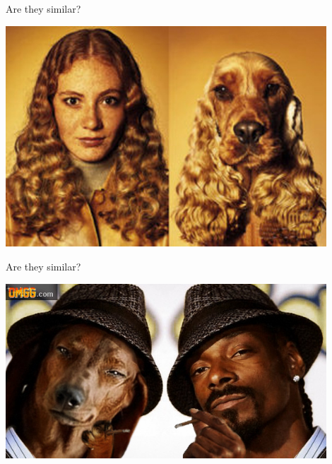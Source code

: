 \documentclass[pdf]{beamer}
\begin{document}
\begin{frame}{Are they similar?}
\begin{center}
	\includegraphics[width=0.9\textwidth]{dogLookAlike.jpg}
\end{center}
\end{frame}
\begin{frame}{Are they similar?}
\begin{center}
	\includegraphics[width=0.9\textwidth]{snoopDog.jpg}
\end{center}
\end{frame}
\end{document}
